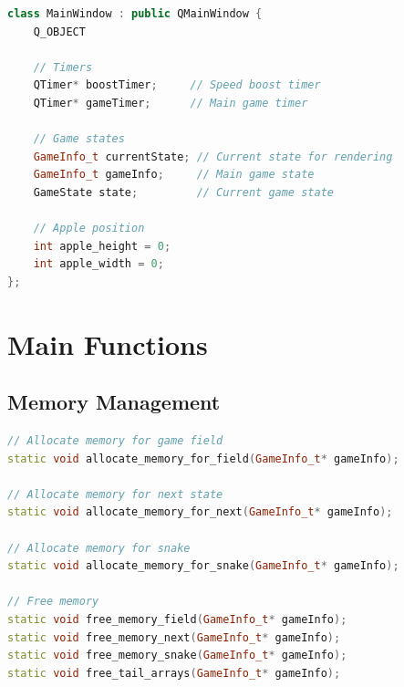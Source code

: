 \documentclass[12pt,a4paper]{article}
\begin{document}
\begin{lstlisting}[language=C++,caption=Main class fields]
class MainWindow : public QMainWindow {
    Q_OBJECT
    
    // Timers
    QTimer* boostTimer;     // Speed boost timer
    QTimer* gameTimer;      // Main game timer
    
    // Game states
    GameInfo_t currentState; // Current state for rendering
    GameInfo_t gameInfo;     // Main game state
    GameState state;         // Current game state
    
    // Apple position
    int apple_height = 0;
    int apple_width = 0;
};
\end{lstlisting}

\section{Main Functions}

\subsection{Memory Management}
\begin{lstlisting}[language=C++,caption=Memory management functions]
// Allocate memory for game field
static void allocate_memory_for_field(GameInfo_t* gameInfo);

// Allocate memory for next state
static void allocate_memory_for_next(GameInfo_t* gameInfo);

// Allocate memory for snake
static void allocate_memory_for_snake(GameInfo_t* gameInfo);

// Free memory
static void free_memory_field(GameInfo_t* gameInfo);
static void free_memory_next(GameInfo_t* gameInfo);
static void free_memory_snake(GameInfo_t* gameInfo);
static void free_tail_arrays(GameInfo_t* gameInfo);
\end{lstlisting}
\end{document}

